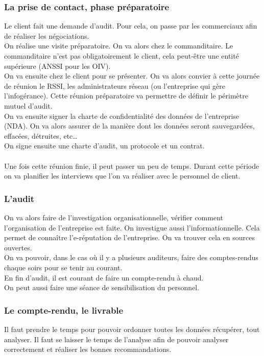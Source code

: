 \subsubsection{La prise de contact, phase préparatoire}
Le client fait une demande d'audit. Pour cela, on passe par les commerciaux afin de réaliser les négociations.\\
On réalise une visite préparatoire. On va alors chez le commanditaire. Le commanditaire n'est pas obligatoirement le client, cela peut-être une entité supérieure (ANSSI pour les OIV).\\
On va ensuite chez le client pour se présenter. On va alors convier à cette journée de réunion le RSSI, les administrateurs réseau (ou l'entreprise qui gère l’infogérance). Cette réunion préparatoire va permettre de définir le périmètre mutuel d'audit.\\
On va ensuite signer la charte de confidentialité des données de l'entreprise (NDA). On va alors assurer de la manière dont les données seront sauvegardées, effacées, détruites, etc\ldots\\
On signe ensuite une charte d'audit, un protocole et un contrat.\\~\\
Une fois cette réunion finie, il peut passer un peu de temps. Durant cette période on va planifier les interviews que l'on va réaliser avec le personnel de client.
\subsubsection{L'audit}
On va alors faire de l'investigation organisationnelle, vérifier comment l'organisation de l'entreprise est faite. On investigue aussi l'informationnelle. Cela permet de connaître l'e-réputation de l'entreprise. On va trouver cela en sources ouvertes.\\
On va pouvoir, dans le cas où il y a plusieurs auditeurs, faire des comptes-rendus chaque soirs pour se tenir au courant.\\
En fin d'audit, il est courant de faire un compte-rendu à chaud.\\
On peut aussi faire une séance de sensibilisation du personnel.
\subsubsection{Le compte-rendu, le livrable}
Il faut prendre le temps pour pouvoir ordonner toutes les données récupérer, tout analyser. Il faut se laisser le temps de l'analyse afin de pouvoir analyser correctement et réaliser les bonnes recommandations.


